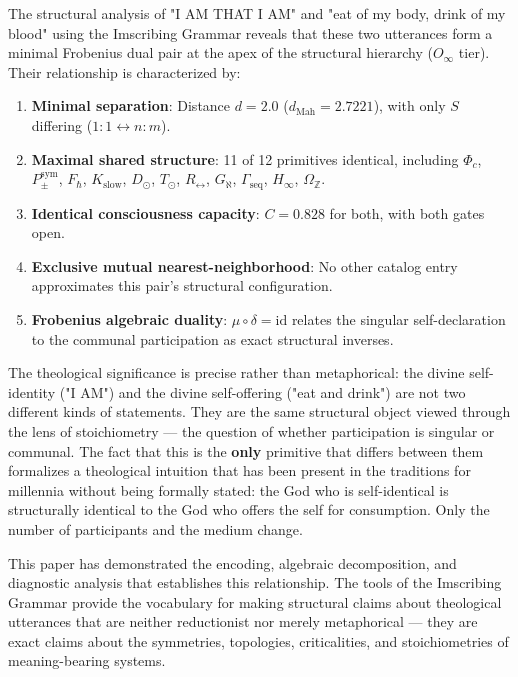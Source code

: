 \documentclass[12pt,a4paper]{article}
\begin{document}
The structural analysis of "I AM THAT I AM" and "eat of my body, drink of my blood" using the Imscribing Grammar reveals that these two utterances form a minimal Frobenius dual pair at the apex of the structural hierarchy ($O_{\infty}$ tier). Their relationship is characterized by:

\begin{enumerate}
    \item \textbf{Minimal separation}: Distance $d = 2.0$ ($d_{\text{Mah}} = 2.7221$), with only $S$ differing ($1{:}1 \leftrightarrow n{:}m$).
    \item \textbf{Maximal shared structure}: 11 of 12 primitives identical, including $\Phi_c$, $P_{\pm}^{\text{sym}}$, $F_{\hbar}$, $K_{\text{slow}}$, $D_{\odot}$, $T_{\odot}$, $R_{\leftrightarrow}$, $G_{\aleph}$, $\Gamma_{\text{seq}}$, $H_{\infty}$, $\Omega_\mathbb{Z}$.
    \item \textbf{Identical consciousness capacity}: $C = 0.828$ for both, with both gates open.
    \item \textbf{Exclusive mutual nearest-neighborhood}: No other catalog entry approximates this pair's structural configuration.
    \item \textbf{Frobenius algebraic duality}: $\mu \circ \delta = \text{id}$ relates the singular self-declaration to the communal participation as exact structural inverses.
\end{enumerate}

The theological significance is precise rather than metaphorical: the divine self-identity ("I AM") and the divine self-offering ("eat and drink") are not two different kinds of statements. They are the same structural object viewed through the lens of stoichiometry --- the question of whether participation is singular or communal. The fact that this is the \textbf{only} primitive that differs between them formalizes a theological intuition that has been present in the traditions for millennia without being formally stated: the God who is self-identical is structurally identical to the God who offers the self for consumption. Only the number of participants and the medium change.

This paper has demonstrated the encoding, algebraic decomposition, and diagnostic analysis that establishes this relationship. The tools of the Imscribing Grammar provide the vocabulary for making structural claims about theological utterances that are neither reductionist nor merely metaphorical --- they are exact claims about the symmetries, topologies, criticalities, and stoichiometries of meaning-bearing systems.
\end{document}
